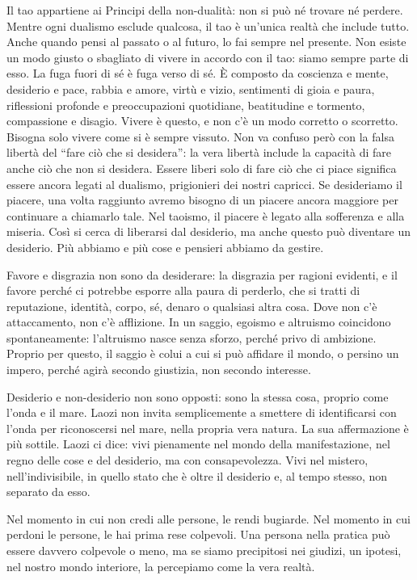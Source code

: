 \documentclass[12pt]{book} %
\begin{document}
Il tao appartiene ai Principi della non-dualità: non si può né trovare né perdere. Mentre ogni dualismo esclude qualcosa, il tao è un'unica realtà che include tutto. Anche quando pensi al passato o al futuro, lo fai sempre nel presente. Non esiste un modo giusto o sbagliato di vivere in accordo con il tao: siamo sempre parte di esso. La fuga fuori di sé è fuga verso di sé.
È composto da coscienza e mente, desiderio e pace, rabbia e amore, virtù e vizio, sentimenti di gioia e paura, riflessioni profonde e preoccupazioni quotidiane, beatitudine e tormento, compassione e disagio. Vivere è questo, e non c’è un modo corretto o scorretto. Bisogna solo vivere come si è sempre vissuto.
Non va confuso però con la falsa libertà del “fare ciò che si desidera”: la vera libertà include la capacità di fare anche ciò che non si desidera. Essere liberi solo di fare ciò che ci piace significa essere ancora legati al dualismo, prigionieri dei nostri capricci.
Se desideriamo il piacere, una volta raggiunto avremo bisogno di un piacere ancora maggiore per continuare a chiamarlo tale. Nel taoismo, il piacere è legato alla sofferenza e alla miseria. Così si cerca di liberarsi dal desiderio, ma anche questo può diventare un desiderio. Più abbiamo e più cose e pensieri abbiamo da gestire.

Favore e disgrazia non sono da desiderare: la disgrazia per ragioni evidenti, e il favore perché ci potrebbe esporre alla paura di perderlo, che si tratti di reputazione, identità, corpo, sé, denaro o qualsiasi altra cosa.
Dove non c'è attaccamento, non c'è afflizione.
In un saggio, egoismo e altruismo coincidono spontaneamente: l’altruismo nasce senza sforzo, perché privo di ambizione.
Proprio per questo, il saggio è colui a cui si può affidare il mondo, o persino un impero, perché agirà secondo giustizia, non secondo interesse.

Desiderio e non-desiderio non sono opposti: sono la stessa cosa, proprio come l’onda e il mare.
Laozi non invita semplicemente a smettere di identificarsi con l’onda per riconoscersi nel mare, nella propria vera natura. La sua affermazione è più sottile.
Laozi ci dice: vivi pienamente nel mondo della manifestazione, nel regno delle cose e del desiderio, ma con consapevolezza. Vivi nel mistero, nell’indivisibile, in quello stato che è oltre il desiderio e, al tempo stesso, non separato da esso.

Nel momento in cui non credi alle persone, le rendi bugiarde.
Nel momento in cui perdoni le persone, le hai prima rese colpevoli.
Una persona nella pratica può essere davvero colpevole o meno, ma se siamo precipitosi nei giudizi, un ipotesi, nel nostro mondo interiore, la percepiamo come la vera realtà.
\end{document}
